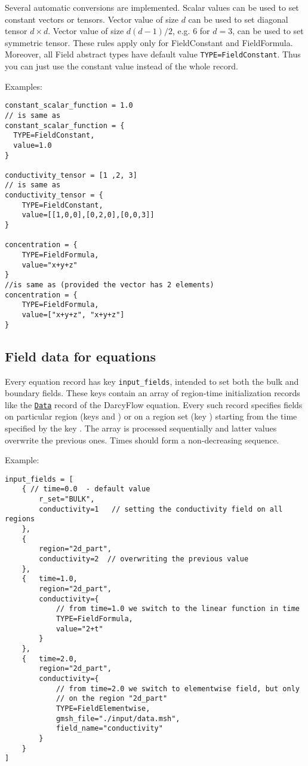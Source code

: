 Several automatic conversions are implemented. Scalar values can be used to set constant vectors or tensors. Vector value of size $d$ can be used to set diagonal tensor $d\times d$.
Vector value of size $d(d-1)/2$, e.g. $6$ for $d=3$, can be used to set symmetric tensor. These rules apply only for FieldConstant and FieldFormula.
Moreover, all Field abstract types have default value \verb'TYPE=FieldConstant'. Thus you can just use the constant value instead of the whole record.

Examples:
\begin{verbatim}
constant_scalar_function = 1.0
// is same as
constant_scalar_function = {
  TYPE=FieldConstant,
  value=1.0
}

conductivity_tensor = [1 ,2, 3]
// is same as
conductivity_tensor = {
    TYPE=FieldConstant,
    value=[[1,0,0],[0,2,0],[0,0,3]]
}

concentration = {
    TYPE=FieldFormula,
    value="x+y+z"
}
//is same as (provided the vector has 2 elements)
concentration = {
    TYPE=FieldFormula,
    value=["x+y+z", "x+y+z"]
}       
\end{verbatim}

\subsection{Field data for equations}
Every equation record has key \verb'input_fields', intended to set both the bulk and boundary fields. These keys contain an array of region-time initialization records
like the \hyperlink{IT::DarcyFlowMH-Data}{\tt Data} record of the DarcyFlow equation. Every such record specifies fields on particular region 
(keys  and  ) or on a region set 
(key ) starting from the time specified by the key .
The array is processed sequentially and latter values overwrite the previous ones. Times should form a non-decreasing sequence.

Example:
\begin{verbatim}
input_fields = [   
    { // time=0.0  - default value
        r_set="BULK",
        conductivity=1   // setting the conductivity field on all regions
    },
    {
        region="2d_part",
        conductivity=2  // overwriting the previous value
    },
    {   time=1.0,
        region="2d_part",
        conductivity={
            // from time=1.0 we switch to the linear function in time
            TYPE=FieldFormula,
            value="2+t"      
        }    
    },
    {   time=2.0,
        region="2d_part",
        conductivity={
            // from time=2.0 we switch to elementwise field, but only
            // on the region "2d_part"
            TYPE=FieldElementwise,
            gmsh_file="./input/data.msh",
            field_name="conductivity"
        }
    }    
]               
\end{verbatim}

